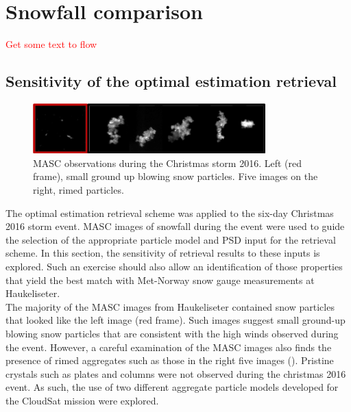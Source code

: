 \section{Snowfall comparison}
\textcolor{red}{Get some text to flow}
\subsection{Sensitivity of the optimal estimation retrieval}\label{sec:ret:sensitivity}
\begin{figure}[h]
	\centering
	\includegraphics[width=0.8\textwidth]{./MASC_obs/blow_part}
	\caption{MASC observations during the Christmas storm 2016. Left (red frame), small ground up blowing snow particles. Five images on the right, rimed particles.}\label{fig:ret:all_part}
\end{figure}
\noindent
The optimal estimation retrieval scheme was applied to the six-day Christmas 2016 storm event.  MASC images of snowfall during the event were used to guide the selection of the appropriate particle model and PSD input for the retrieval scheme. In this section, the sensitivity of retrieval results to these inputs is explored. Such an exercise should also allow an identification of those properties that yield the best match with Met-Norway snow gauge measurements at Haukeliseter.  
\\
The majority of the MASC images from Haukeliseter contained snow particles that looked like the left image  (red frame). Such images suggest small ground-up blowing snow particles that are consistent with the high winds observed during the event.  However, a careful examination of the MASC images also finds the presence of rimed aggregates such as those in the right five images (). Pristine crystals such as plates and columns were not observed during the christmas 2016 event.  As such, the use of two different aggregate particle models developed for the CloudSat mission were explored. 
